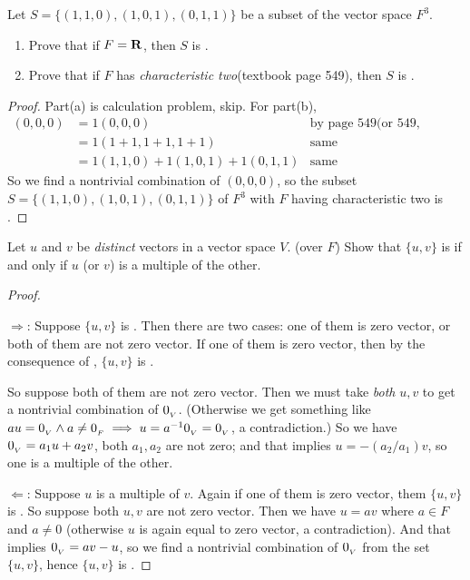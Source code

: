 \begin{exercise} \label{exercise 1.5.8}
Let \(S = \{(1, 1, 0), (1, 0, 1), (0, 1, 1)\}\) be a subset of the vector space \(F^3\).
\begin{enumerate}
\item Prove that if \(F = \mathbf{R}\), then \(S\) is \LID{}.
\item Prove that if \(F\) has \emph{characteristic two}(textbook page 549), then \(S\) is \LDP{}.
\end{enumerate}
\end{exercise}

\begin{proof}
Part(a) is calculation problem, skip.
For part(b),
\begin{align*}
    (0, 0, 0) & = 1(0, 0, 0) & \text{by page 549(or 549, example 4)} \\
              & = 1(1 + 1, 1 + 1, 1 + 1) & \text{same} \\
              & = 1(1, 1, 0) + 1(1, 0, 1) + 1(0, 1, 1) & \text{same}
\end{align*}
So we find a nontrivial combination of \((0, 0, 0)\), so the subset \(S = \{(1, 1, 0), (1, 0, 1), (0, 1, 1)\}\) of \(F^3\) with \(F\) having characteristic two is \LDP{}.
\end{proof}

\begin{exercise} \label{exercise 1.5.9}
Let \(u\) and \(v\) be \emph{distinct} vectors in a vector space \(V\). (over \(F\))
Show that \(\{ u, v \}\) is \LDP{} if and only if \(u\) (or \(v\)) is a multiple of the other.
\end{exercise}

\begin{proof}\ 

\(\Longrightarrow\):
Suppose \(\{ u, v \}\) is \LDP{}.
Then there are two cases: one of them is zero vector, or both of them are not zero vector.
If one of them is zero vector, then by the consequence of , \(\{ u, v \}\) is \LDP{}.

So suppose both of them are not zero vector.
Then we must take \emph{both} \(u, v\) to get a nontrivial combination of \(0_{_V}\). (Otherwise we get something like \(a u = 0_{_V} \land a \ne 0_{_F} \implies u = a^{-1} 0_{_V} = 0_{_V}\), a contradiction.)
So we have \(0_{_V} = a_1 u + a_2 v\), both \(a_1, a_2\) are not zero;
and that implies \(u = -(a_2/a_1)v\), so one is a multiple of the other.

\(\Longleftarrow\):
Suppose \(u\) is a multiple of \(v\).
Again if one of them is zero vector, them \(\{ u, v \}\) is \LDP{}.
So suppose both \(u, v\) are not zero vector.
Then we have \(u = a v\) where \(a \in F\) and \(a \ne 0\) (otherwise \(u\) is again equal to zero vector, a contradiction).
And that implies \(0_{_V} = a v - u\), so we find a nontrivial combination of \(0_{_V}\) from the set \(\{u, v\}\), hence \(\{ u, v \}\) is \LDP{}.
\end{proof}

